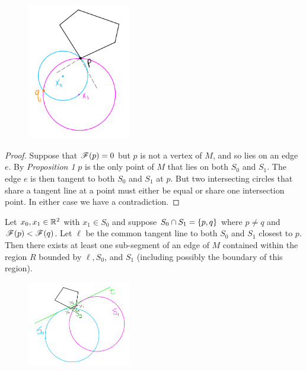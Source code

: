 \documentclass[12pt]{article}
\begin{document}
\begin{flushleft}
\begin{figure}[H]
	\centering
	\includegraphics[width=0.4\textwidth]{3.png}
\end{figure}

\begin{proof}
	Suppose that $\mathscr{F}(p)=0$ but $p$ is not a vertex of $M$, and so lies on an edge $e$.
	By \textit{Proposition 1} $p$ is the only point of $M$ that lies on both $S_0$ and $S_1$.
	The edge $e$ is then tangent to both $S_0$ and $S_1$ at $p$.
	But two intersecting circles that share a tangent line at a point must either be equal or share one intersection point.
	In either case we have a contradiction.
\end{proof}

\begin{prop}{3}
	Let $x_0,x_1\in \mathbb{R}^2$ with $x_1\in S_0$ and suppose $S_0\cap S_1=\{p,q\}$ where $p\neq q$ and $\mathscr{F}(p)<\mathscr{F}(q)$.
	Let $\ell$ be the common tangent line to both $S_0$ and $S_1$ closest to $p$.
	Then there exists at least one sub-segment of an edge of $M$ contained within the region $R$ bounded by $\ell, S_0$, and $S_1$ (including possibly the boundary of this region).
\end{prop}

\begin{figure}[H]
	\centering
	\includegraphics[width=0.4\textwidth]{4.png}
\end{figure}


\end{flushleft}
\end{document}
